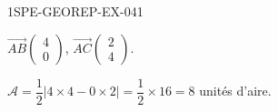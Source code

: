 \begin{corrige}{1SPE-GEOREP-EX-041}

$\vec{AB}\begin{pmatrix} 4 \\ 0 \end{pmatrix}$, $\vec{AC}\begin{pmatrix} 2 \\ 4 \end{pmatrix}$.

$\mathcal{A} = \dfrac{1}{2}|4 \times 4 - 0 \times 2| = \dfrac{1}{2} \times 16 = \boxed{8}$ unités d'aire.

\end{corrige}
